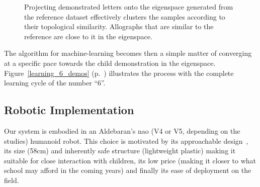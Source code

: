 \documentclass{article}
\begin{document}
\begin{figure}[ht!]
    \centering

    \caption{\small Projecting demonstrated letters onto the eigenspace
    generated from the reference dataset effectively clusters the samples
    according to their topological similarity. Allographs that are similar to
    the reference are close to it in the eigenspace.}
    \label{fig:h}
\end{figure}

The algorithm for machine-learning becomes then a simple matter of converging at
a specific pace towards the child demonstration in the eigenspace.
Figure~\ref{learning_6_demos} (p.~\pageref{learning_6_demos}) illustrates the
process with the complete learning cycle of the number ``6''.

\subsection{Robotic Implementation}

Our system is embodied in an Aldebaran's {\sc nao} (V4 or V5, depending on the
studies) humanoid robot. This choice is motivated by its approachable
design~\cite{Gouaillier2008}, its size (58cm) and inherently safe structure
(lightweight plastic) making it suitable for close interaction with children,
its low price (making it closer to what school may afford in the coming years)
and finally its ease of deployment on the field.
\end{document}
